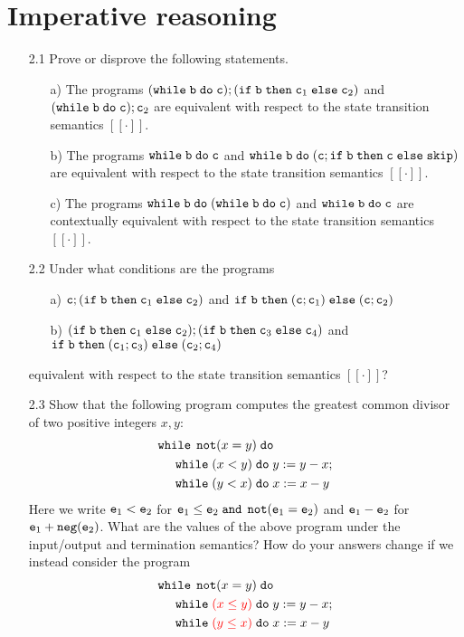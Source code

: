 \documentclass{article}
\begin{document}
\section{Imperative reasoning}
\begin{enumerate}

\item[2.1] Prove or disprove the following statements.
\begin{enumerate}
\item[a)] The programs $(\mathtt{while}\; \mathtt{b} \; \mathtt{do} \; \mathtt{c}); (\mathtt{if} \; \mathtt{b} \; \mathtt{then} \; \mathtt{c}_1 \; \mathtt{else} \; \mathtt{c}_2)$ and $(\mathtt{while} \; \mathtt{b} \; \mathtt{do} \; \mathtt{c});\mathtt{c}_2$
are equivalent with respect to the state transition semantics $[[\cdot]]$.
\item[b)] The programs $\mathtt{while}\; \mathtt{b} \; \mathtt{do} \; \mathtt{c}$ and $\mathtt{while} \; \mathtt{b} \; \mathtt{do} \; (\mathtt{c};\mathtt{if} \; \mathtt{b} \; \mathtt{then} \; \mathtt{c} \; \mathtt{else} \; \mathtt{skip})$ are equivalent with respect to the state transition semantics $[[\cdot]]$.
\item[c)] The programs $\mathtt{while}\; \mathtt{b} \; \mathtt{do} \; (\mathtt{while} \; \mathtt{b} \; \mathtt{do} \; \mathtt{c})$ and $\mathtt{while}\; \mathtt{b} \; \mathtt{do} \; \mathtt{c}$ are contextually equivalent with respect to the state transition semantics $[[\cdot]]$.
\end{enumerate}

\item[2.2] Under what conditions are the programs
\begin{enumerate} 
\item[a)] $\mathtt{c};(\mathtt{if} \; \mathtt{b} \; \mathtt{then}\; \mathtt{c}_1\; \mathtt{else} \; \mathtt{c}_2)$ and $\mathtt{if} \; \mathtt{b} \; \mathtt{then}\; (\mathtt{c}; \mathtt{c}_1) \; \mathtt{else} \; (\mathtt{c}; \mathtt{c}_2)$
\item[b)] $(\mathtt{if} \; \mathtt{b} \; \mathtt{then}\; \mathtt{c}_1 \; \mathtt{else} \; \mathtt{c}_2); (\mathtt{if} \; \mathtt{b} \; \mathtt{then} \; \mathtt{c}_3 \; \mathtt{else} \; \mathtt{c}_4)$ and $\mathtt{if} \; \mathtt{b} \; \mathtt{then}\; (\mathtt{c}_1;\mathtt{c}_3) \; \mathtt{else} \; (\mathtt{c}_2;\mathtt{c}_4)$
\end{enumerate}
equivalent with respect to the state transition semantics $[[\cdot]]$?

\item[2.3] Show that the following program computes the greatest common divisor of two positive integers $x,y$:
\begin{align*}
& \mathtt{while} \; \mathop{\mathtt{not}}(x = y) \; \mathtt{do} \\
& \;\;\;\;\; \mathtt{while} \; (x < y) \; \mathtt{do} \; y := y - x; \\
& \;\;\;\;\; \mathtt{while} \; (y < x) \; \mathtt{do} \; x := x - y
\end{align*}
Here we write $\mathtt{e}_1 < \mathtt{e}_2$ for $\mathtt{e}_1 \leq \mathtt{e}_2 \; \mathtt{and} \; \mathop{\mathtt{not}}(\mathtt{e}_1 = \mathtt{e}_2)$ and $\mathtt{e}_1 - \mathtt{e}_2$ for $\mathtt{e}_1 + \mathtt{neg}(\mathtt{e}_2)$. What are the values of the above program under the input/output and termination semantics? How do your answers change if we instead consider the program
\begin{align*}
& \mathtt{while} \; \mathop{\mathtt{not}}(x = y) \; \mathtt{do} \\
& \;\;\;\;\; \mathtt{while} \; {\color{red} (x \leq y)} \; \mathtt{do} \; y := y - x; \\
& \;\;\;\;\; \mathtt{while} \; {\color{red} (y \leq x)} \; \mathtt{do} \; x := x - y
\end{align*}
\end{enumerate}
\end{document}
